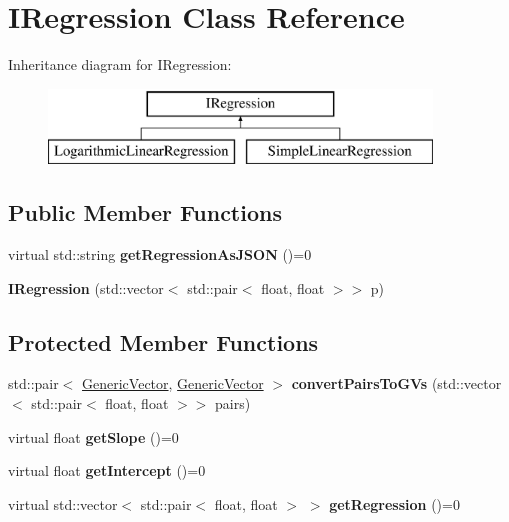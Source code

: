 \hypertarget{classIRegression}{}\section{I\+Regression Class Reference}
\label{classIRegression}
Inheritance diagram for I\+Regression\+:\begin{figure}[H]
\begin{center}
\leavevmode
\includegraphics[height=2.000000cm]{classIRegression}
\end{center}
\end{figure}
\subsection*{Public Member Functions}
\begin{DoxyCompactItemize}
\item 
\mbox{\label{classIRegression_ae8f41b89c9d8547d1d03749ac9ba9f4b}} 
virtual std\+::string {\bfseries get\+Regression\+As\+J\+S\+ON} ()=0
\item 
\mbox{\label{classIRegression_a96ea1a25100c62c8fff0b6c8c134946c}} 
{\bfseries I\+Regression} (std\+::vector$<$ std\+::pair$<$ float, float $>$$>$ p)
\end{DoxyCompactItemize}
\subsection*{Protected Member Functions}
\begin{DoxyCompactItemize}
\item 
\mbox{\label{classIRegression_a98c5a0c7bc09079c42239f9b765a9c88}} 
std\+::pair$<$ \hyperlink{classGenericVector}{Generic\+Vector}, \hyperlink{classGenericVector}{Generic\+Vector} $>$ {\bfseries convert\+Pairs\+To\+G\+Vs} (std\+::vector$<$ std\+::pair$<$ float, float $>$$>$ pairs)
\item 
\mbox{\label{classIRegression_a8790d7641b1ade722715e5d8bf473344}} 
virtual float {\bfseries get\+Slope} ()=0
\item 
\mbox{\label{classIRegression_a5a1a2500a739b98435563e5115576228}} 
virtual float {\bfseries get\+Intercept} ()=0
\item 
\mbox{\label{classIRegression_af62863f66e768a0bb482000862b16164}} 
virtual std\+::vector$<$ std\+::pair$<$ float, float $>$ $>$ {\bfseries get\+Regression} ()=0
\end{DoxyCompactItemize}
